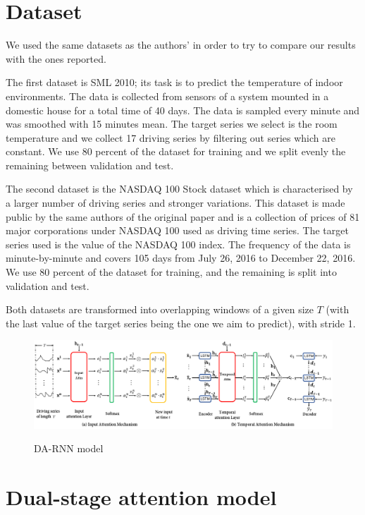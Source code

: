 \documentclass{article}
\begin{document}
\section{Dataset}
\label{sec:retrieval}

We used the same datasets as the authors' in order to try to compare our results
with the ones reported.

The first dataset is SML 2010; its task is to predict the temperature of indoor 
environments. The data is collected from sensors of a system mounted in a 
domestic house for a total time of 40 days. The data is sampled every minute and 
was smoothed with 15 minutes mean. The target series we select is the room 
temperature and we collect 17 driving series by filtering out series which
are constant. We use $80$ percent of the dataset for training and we 
split evenly the remaining between validation and test.

The second dataset is the NASDAQ 100 Stock dataset which is characterised by a
larger number of driving series and stronger variations. This dataset is
made public by the same
authors of the original paper and is a collection of prices of 81 major
corporations under NASDAQ 100 used as driving time series. The target series
used is the value of the NASDAQ 100 index. The frequency of the data is 
minute-by-minute and covers 105 days from July 26, 2016 to December 22, 2016. 
We use $80$ percent of the dataset for training, and the remaining is split into 
validation and test.

Both datasets are transformed into overlapping windows of a given size
$T$ (with the last value of the target series being the one we aim to predict), with stride 1.

\begin{figure}[h]
\centering
\includegraphics[width=\linewidth]{da-rnn.png} \\
\caption{DA-RNN model}

\label{fig:da-rnn}
\end{figure}


\section{Dual-stage attention model}
\label{sec:da-rnn}
\end{document}
